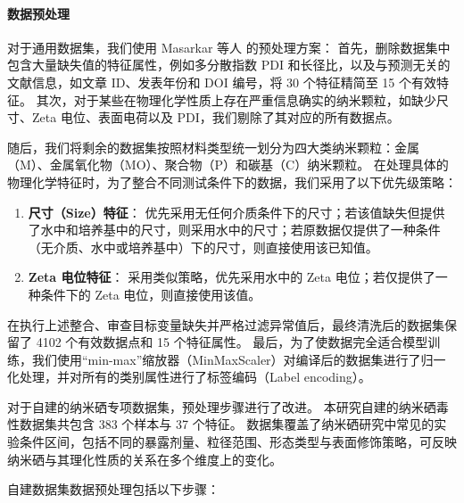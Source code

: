 \paragraph{数据预处理}
对于通用数据集，我们使用 Masarkar 等人 \cite{masarkar2024} 的预处理方案：
首先，删除数据集中包含大量缺失值的特征属性，例如多分散指数 PDI 和长径比，以及与预测无关的文献信息，如文章 ID、发表年份和 DOI 编号，将 30 个特征精简至 15 个有效特征。
其次，对于某些在物理化学性质上存在严重信息确实的纳米颗粒，如缺少尺寸、Zeta 电位、表面电荷以及 PDI，我们剔除了其对应的所有数据点。

随后，我们将剩余的数据集按照材料类型统一划分为四大类纳米颗粒：金属（M）、金属氧化物（MO）、聚合物（P）和碳基（C）纳米颗粒。
在处理具体的物理化学特征时，为了整合不同测试条件下的数据，我们采用了以下优先级策略：

\begin{enumerate}
  \item \textbf{尺寸（Size）特征}：
优先采用无任何介质条件下的尺寸；若该值缺失但提供了水中和培养基中的尺寸，则采用水中的尺寸；若原数据仅提供了一种条件（无介质、水中或培养基中）下的尺寸，则直接使用该已知值。

  \item \textbf{Zeta 电位特征}：
采用类似策略，优先采用水中的 Zeta 电位；若仅提供了一种条件下的 Zeta 电位，则直接使用该值。
\end{enumerate}

在执行上述整合、审查目标变量缺失并严格过滤异常值后，最终清洗后的数据集保留了 4102 个有效数据点和 15 个特征属性。
最后，为了使数据完全适合模型训练，我们使用“min-max”缩放器（MinMaxScaler）对编译后的数据集进行了归一化处理，并对所有的类别属性进行了标签编码（Label encoding）。

对于自建的纳米硒专项数据集，预处理步骤进行了改进。
本研究自建的纳米硒毒性数据集共包含 383 个样本与 37 个特征。
数据集覆盖了纳米硒研究中常见的实验条件区间，包括不同的暴露剂量、粒径范围、形态类型与表面修饰策略，可反映纳米硒与其理化性质的关系在多个维度上的变化。

自建数据集数据预处理包括以下步骤：

